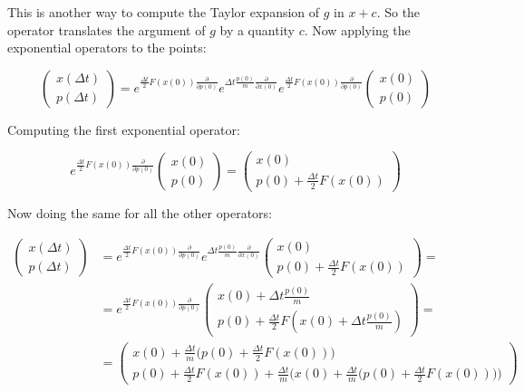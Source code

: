 	This is another way to compute the Taylor expansion of $g$ in $x+c$.
	So the operator translates the argument of $g$ by a quantity $c$.
	Now applying the exponential operators to the points:

	$$\begin{pmatrix}x(\Delta t)\\p(\Delta t)\end{pmatrix} = e^{\frac{\Delta t}{2}F(x(0))\frac{\partial}{\partial p(0)}}e^{\Delta t\frac{p(0)}{m}\frac{\partial}{\partial x(0)}}e^{\frac{\Delta t}{2}F(x(0))\frac{\partial}{\partial p(0)}}\begin{pmatrix}x(0)\\p(0)\end{pmatrix}$$

	Computing the first exponential operator:

	$$e^{\frac{\Delta t}{2}F(x(0))\frac{\partial}{\partial p(0)}}\begin{pmatrix}x(0)\\p(0)\end{pmatrix} = \begin{pmatrix}x(0)\\p(0) + \frac{\Delta t}{2}F(x(0))\end{pmatrix}$$

	Now doing the same for all the other operators:

	\begin{align*}
		\begin{pmatrix} x(\Delta t)\\ p(\Delta t)\end{pmatrix} &= e^{\frac{\Delta t}{2}F(x(0))\frac{\partial}{\partial p(0)}}e^{\Delta t\frac{p(0)}{m}\frac{\partial }{\partial x(0)}}\begin{pmatrix} x(0)\\p(0) + \frac{\Delta t}{2}F(x(0))\end{pmatrix} =\\
																													 & = e^{\frac{\Delta t}{2}F(x(0))\frac{\partial}{\partial p(0)}}\begin{pmatrix}x(0) + \Delta t\frac{p(0)}{m}\\p(0) + \frac{\Delta t}{2}F(x(0) + \Delta t\frac{p(0)}{m})\end{pmatrix} =\\
																													 &= \begin{pmatrix} x(0) + \frac{\Delta t}{m}\biggl(p(0) + \frac{\Delta t}{2}F(x(0))\biggr) \\ p(0) + \frac{\Delta t}{2}F(x(0)) + \frac{\Delta t}{m}\biggl(x(0) + \frac{\Delta t}{m}\biggl(p(0) + \frac{\Delta t}{2}F(x(0))\biggr)\biggr)\end{pmatrix}
	\end{align*}

